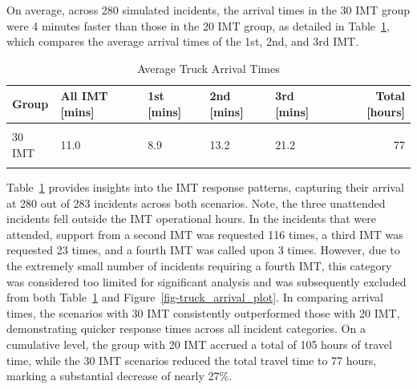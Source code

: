\documentclass[fancy, oneside, mastersfancy, ms]{byuthesis}
\begin{document}
On average, across 280 simulated incidents, the arrival times in the 30
IMT group were 4 minutes faster than those in the 20 IMT group, as
detailed in Table~\ref{tbl-truck_arrival_table}, which compares the
average arrival times of the 1st, 2nd, and 3rd IMT.

\hypertarget{tbl-truck_arrival_table}{}
\begin{table}
\caption{\label{tbl-truck_arrival_table}Average Truck Arrival Times }\tabularnewline

\centering
\begin{tabular}[t]{lllllr}
\toprule
\textbf{Group} & \textbf{All IMT [mins]} & \textbf{1st [mins]} & \textbf{2nd [mins]} & \textbf{3rd [mins]} & \textbf{Total [hours]}\\
\midrule
\cellcolor{gray!6}{20 IMT} & \cellcolor{gray!6}{15.0} & \cellcolor{gray!6}{11.1} & \cellcolor{gray!6}{21.1} & \cellcolor{gray!6}{28.9} & \cellcolor{gray!6}{105}\\
30 IMT & 11.0 & 8.9 & 13.2 & 21.2 & 77\\
\cellcolor{gray65}{\cellcolor{gray!6}{Incidents}} & \cellcolor{gray65}{\cellcolor{gray!6}{280}} & \cellcolor{gray65}{\cellcolor{gray!6}{280}} & \cellcolor{gray65}{\cellcolor{gray!6}{116}} & \cellcolor{gray65}{\cellcolor{gray!6}{23}} & \cellcolor{gray65}{\cellcolor{gray!6}{280}}\\
\bottomrule
\end{tabular}
\end{table}

Table~\ref{tbl-truck_arrival_table} provides insights into the IMT
response patterns, capturing their arrival at 280 out of 283 incidents
across both scenarios. Note, the three unattended incidents fell outside
the IMT operational hours. In the incidents that were attended, support
from a second IMT was requested 116 times, a third IMT was requested 23
times, and a fourth IMT was called upon 3 times. However, due to the
extremely small number of incidents requiring a fourth IMT, this
category was considered too limited for significant analysis and was
subsequently excluded from both Table~\ref{tbl-truck_arrival_table} and
Figure~\ref{fig-truck_arrival_plot}. In comparing arrival times, the
scenarios with 30 IMT consistently outperformed those with 20 IMT,
demonstrating quicker response times across all incident categories. On
a cumulative level, the group with 20 IMT accrued a total of 105 hours
of travel time, while the 30 IMT scenarios reduced the total travel time
to 77 hours, marking a substantial decrease of nearly 27\%.
\end{document}
